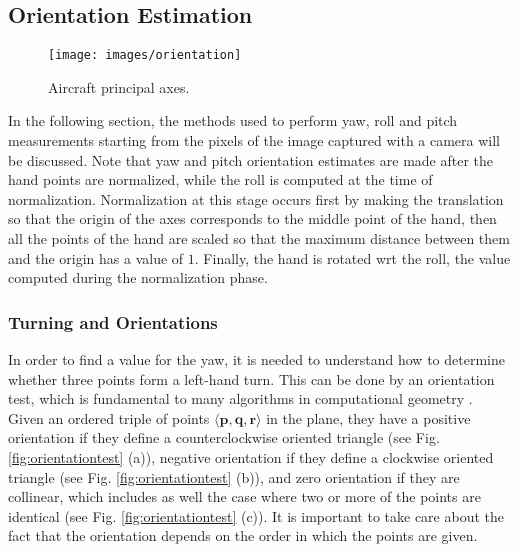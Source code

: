 \subsection{Orientation Estimation}
\label{sec:orientationestimation}

\begin{figure}[H]
	\centering
	\texttt{[image: images/orientation]}
	\caption[Aircraft principal axes.]{Aircraft principal axes.}
	\label{fig:orientation}
\end{figure}

In the following section, the methods used to perform yaw, roll and pitch measurements starting from the pixels of the image captured with a camera will be discussed. Note that yaw and pitch orientation estimates are made after the hand points are normalized, while the roll is computed at the time of normalization. Normalization at this stage occurs first by making the translation so that the origin of the axes corresponds to the middle point of the hand, then all the points of the hand are scaled so that the maximum distance between them and the origin has a value of $1$. Finally, the hand is rotated \gls{wrt} the roll, the value computed during the normalization phase.

\subsubsection{Turning and Orientations}
\label{subsec:orientationtest}
In order to find a value for the yaw, it is needed to understand how to determine whether three points form a left-hand turn. This can be done by an orientation test, which is fundamental to many algorithms in computational geometry \cite[]{CMSC75428:online}. Given an ordered triple of points $\langle \bm{p}, \bm{q}, \bm{r} \rangle$ in the plane, they have a positive orientation if they define a counterclockwise oriented triangle (see Fig. \ref{fig:orientationtest} (a)), negative orientation if they define a clockwise oriented triangle (see Fig. \ref{fig:orientationtest} (b)), and zero orientation if they are collinear, which includes as well the case where two or more of the points are identical (see Fig. \ref{fig:orientationtest} (c)). It is important to take care about the fact that the orientation depends on the order in which the points are given.

